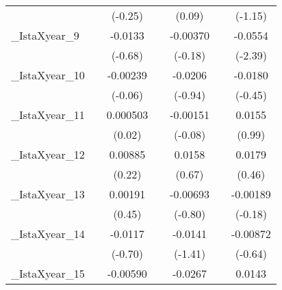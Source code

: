 {\begin{tabular}{l*{6}{c}}
            &                     &     (-0.25)         &                     &      (0.09)         &                     &     (-1.15)         \\
[1em]
\_IstaXyear\_9&                     &     -0.0133         &                     &    -0.00370         &                     &     -0.0554\sym{*}  \\
            &                     &     (-0.68)         &                     &     (-0.18)         &                     &     (-2.39)         \\
[1em]
\_IstaXyear\_10&                     &    -0.00239         &                     &     -0.0206         &                     &     -0.0180         \\
            &                     &     (-0.06)         &                     &     (-0.94)         &                     &     (-0.45)         \\
[1em]
\_IstaXyear\_11&                     &    0.000503         &                     &    -0.00151         &                     &      0.0155         \\
            &                     &      (0.02)         &                     &     (-0.08)         &                     &      (0.99)         \\
[1em]
\_IstaXyear\_12&                     &     0.00885         &                     &      0.0158         &                     &      0.0179         \\
            &                     &      (0.22)         &                     &      (0.67)         &                     &      (0.46)         \\
[1em]
\_IstaXyear\_13&                     &     0.00191         &                     &    -0.00693         &                     &    -0.00189         \\
            &                     &      (0.45)         &                     &     (-0.80)         &                     &     (-0.18)         \\
[1em]
\_IstaXyear\_14&                     &     -0.0117         &                     &     -0.0141         &                     &    -0.00872         \\
            &                     &     (-0.70)         &                     &     (-1.41)         &                     &     (-0.64)         \\
[1em]
\_IstaXyear\_15&                     &    -0.00590         &                     &     -0.0267         &                     &      0.0143         \\

\end{tabular}}
